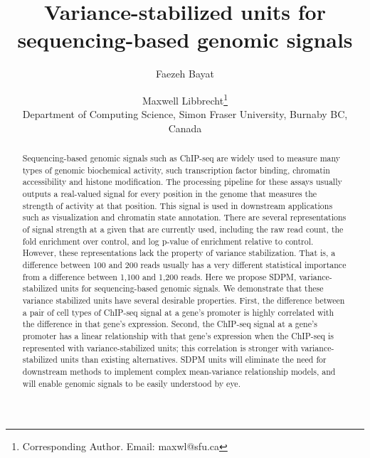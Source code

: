 \documentclass[11pt]{article}
\begin{document}

\title{Variance-stabilized units for sequencing-based genomic signals}
\author
{
\centering
Faezeh Bayat \and Maxwell Libbrecht\footnote{Corresponding Author. Email: maxwl@sfu.ca} \\
Department of Computing Science, Simon Fraser University, Burnaby BC, Canada\\
}

\date{}

\maketitle
\begin{abstract}
Sequencing-based genomic signals such as ChIP-seq are widely used to measure many types of genomic biochemical activity, such transcription factor binding, chromatin accessibility and histone modification. The processing pipeline for these assays usually outputs a real-valued signal for every position in the genome that measures the strength of activity at that position. This signal is used in downstream applications such as visualization and chromatin state annotation. There are several representations of signal strength at a given that are currently used, including the raw read count, the fold enrichment over control, and log p-value of enrichment relative to control. 
However, these representations lack the property of variance stabilization.  That is, a difference between 100 and 200 reads usually has a very different statistical importance from a difference between 1,100 and 1,200 reads. 
Here we propose SDPM, variance-stabilized units for sequencing-based genomic signals.  
We demonstrate that these variance stabilized units have several desirable properties. 
First, the difference between a pair of cell types of ChIP-seq signal at a gene's promoter is highly correlated with the difference in that gene's expression.
Second, the ChIP-seq signal at a gene's promoter has a linear relationship with that gene's expression when the ChIP-seq is represented with variance-stabilized units; this correlation is stronger with variance-stabilized units than existing alternatives. 
SDPM units will eliminate the need for downstream methods to implement complex mean-variance relationship models, and will enable genomic signals to be easily understood by eye. 

\end{abstract}
\end{document}
